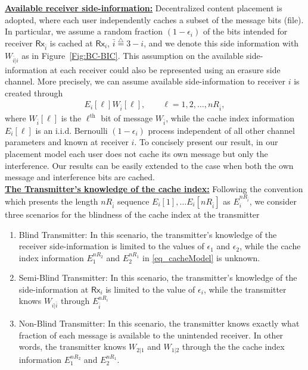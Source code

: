 \documentclass[journal,12pt,draftcls,onecolumn]{IEEEtran}
\newcommand{\msf}{\mathsf}
\newcommand{\lp}{\left(}
\newcommand{\rp}{\right)}
\begin{document}
\noindent \underline{\bf Available receiver side-information:} Decentralized content placement \cite{kao2016blind}\cite{ghorbel2016content} is adopted, where each user independently caches a subset of the message bits (file). In particular, we assume a random fraction $(1-\epsilon_{i})$ of the bits intended for receiver $\msf{Rx}_{\bar{i}}$ is cached at $\msf{Rx}_{{i}}$, $\bar{i} \overset{\triangle}= 3 - i$, and we denote this side information with $W_{\bar{i}|i}$ as in Figure~\ref{Fig:BC-BIC}. This assumption on the available side-information at each receiver could also be represented using an erasure side channel. More precisely, we can assume available side-information to receiver $i$ is created through
\begin{align}
E_i[\ell]W_{\bar{i}}[\ell], \qquad \ell = 1,2,\ldots, nR_{\bar{i}}, \label{eq_cacheModel}
\end{align}
where $W_{\bar{i}}[\ell]$ is the $\ell^\mathrm{th}$ bit of message $W_{\bar{i}}$, while the cache index information $E_i[\ell]$ is an i.i.d. Bernoulli $(1-\epsilon_i)$ process independent of all other channel parameters and known at receiver $i$. To concisely present our result, in our placement model each user does not cache its own message but only the interference. Our results can be easily extended to the case when both the own message and interference bits are cached.\\






\noindent \underline{\bf  The Transmitter's knowledge of the cache index:} Following the convention which presents the length $nR_{\bar{i}}$ sequence $E_i[1], \ldots E_i[nR_{\bar{i}}]$ as $E^{nR_{\bar{i}}}_i$, we consider three scenarios for the blindness of the cache index at the transmitter
\begin{enumerate}

\item Blind Transmitter: In this scenario, the transmitter's knowledge of the receiver side-information is limited to the values of $\epsilon_1$ and $\epsilon_2$, while the cache index information $E^{nR_2}_1$ and $E^{nR_1}_2$ in \eqref{eq_cacheModel} is unknown.

\item Semi-Blind Transmitter: In this scenario, the transmitter's knowledge of the side-information at $\msf{Rx}_i$ is limited to the value of $\epsilon_i$, while the transmitter knows $W_{i|\bar{i}}$ through $E^{nR_{i}}_{\bar{i}}$

\item Non-Blind Transmitter: In this scenario, the transmitter knows exactly what fraction of each message is available to the unintended receiver. In other words, the transmitter knows $W_{2|1}$ and $W_{1|2}$ through the the cache index information $E^{nR_2}_1$ and $E^{nR_1}_2$.\\
\end{enumerate}
\end{document}
